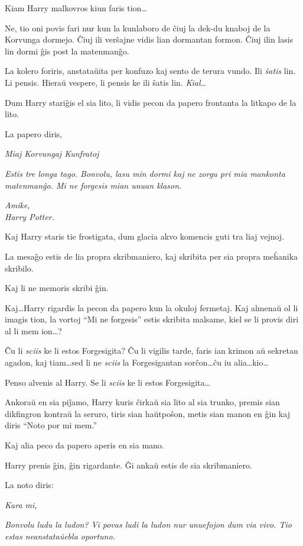 Kiam Harry malkovros kiun faris tion\ldots

Ne, tio oni povis fari nur kun la kunlaboro de ĉiuj la dek-du knaboj
de la Korvunga dormejo. Ĉiuj ili verŝajne vidis lian dormantan
formon. Ĉiuj ilin lasis lin dormi ĝis post la matenmanĝo.

La kolero foriris, anstataŭita per konfuzo kaj sento de terura vundo.
Ili \emph{ŝatis} lin. Li pensis. Hieraŭ vespere, li pensis ke ili
ŝatis lin. \emph{Kial}\ldots

Dum Harry stariĝis el sia lito, li vidis pecon da papero frontanta la
litkapo de la lito.

La papero diris,
\medskip

\emph{Miaj Korvungaj Kunfratoj}

\emph{Estis tre longa tago. Bonvolu, lasu min dormi kaj ne zorgu pri
  mia mankonta matenmanĝo. Mi ne forgesis mian unuan klason.}

\emph{Amike,\\
  Harry Potter.
}
\medskip

Kaj Harry staris tie frostigata, dum glacia akvo komencis guti tra
liaj vejnoj.

La mesaĝo estis de lia propra skribmaniero, kaj skribita per sia
propra meĥanika skribilo.

Kaj li ne memoris skribi ĝin.

Kaj\ldots Harry rigardis la pecon da papero kun la okuloj
fermetaj. Kaj almenaŭ ol li imagis tion, la vortoj ``Mi ne forgesis''
estis skribita malsame, kiel se li provis diri al li mem ion\ldots?

Ĉu li \emph{sciis} ke li estos Forgesigita? Ĉu li vigilis tarde, faris
ian krimon aŭ sekretan agadon, kaj tiam\ldots sed li ne \emph{sciis}
la Forgesigantan sorĉon\ldots ĉu iu alia\ldots kio\ldots

Penso alvenis al Harry. Se li \emph{sciis} ke li estos
Forgesigita\ldots

Ankoraŭ en sia piĵamo, Harry kuris ĉirkaŭ sia lito al sia trunko,
premis sian dikfingron kontraŭ la seruro, tiris sian haŭtpoŝon, metis
sian manon en ĝin kaj diris ``Noto por mi mem.''

Kaj alia peco da papero aperis en sia mano.

Harry prenis ĝin, ĝin rigardante. Ĝi ankaŭ estis de sia skribmaniero.

La noto diris:
\medskip

\emph{Kara mi,}

\emph{Bonvolu ludu la ludon? Vi povas ludi la ludon nur unuefojon dum
  via vivo. Tio estas neanstataŭebla oportuno.}

